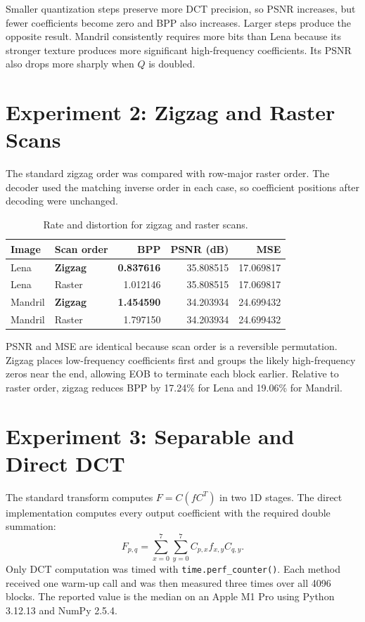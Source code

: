 \documentclass[10pt,a4paper]{article}
\begin{document}
Smaller quantization steps preserve more DCT precision, so PSNR increases, but fewer coefficients become zero and BPP also increases. Larger steps produce the opposite result. Mandril consistently requires more bits than Lena because its stronger texture produces more significant high-frequency coefficients. Its PSNR also drops more sharply when $Q$ is doubled.

\section{Experiment 2: Zigzag and Raster Scans}

The standard zigzag order was compared with row-major raster order. The decoder used the matching inverse order in each case, so coefficient positions after decoding were unchanged.

\begin{table}[ht]
\centering
\small
\begin{tabular}{llrrr}
\toprule
Image & Scan order & BPP & PSNR (dB) & MSE \\
\midrule
Lena    & \textbf{Zigzag} & \textbf{0.837616} & 35.808515 & 17.069817 \\
Lena    & Raster & 1.012146 & 35.808515 & 17.069817 \\
\midrule
Mandril & \textbf{Zigzag} & \textbf{1.454590} & 34.203934 & 24.699432 \\
Mandril & Raster & 1.797150 & 34.203934 & 24.699432 \\
\bottomrule
\end{tabular}
\caption{Rate and distortion for zigzag and raster scans.}
\end{table}

PSNR and MSE are identical because scan order is a reversible permutation. Zigzag places low-frequency coefficients first and groups the likely high-frequency zeros near the end, allowing EOB to terminate each block earlier. Relative to raster order, zigzag reduces BPP by 17.24\% for Lena and 19.06\% for Mandril.

\section{Experiment 3: Separable and Direct DCT}

The standard transform computes $F=C(fC^T)$ in two 1D stages. The direct implementation computes every output coefficient with the required double summation:
\[
    F_{p,q}=\sum_{x=0}^{7}\sum_{y=0}^{7}
    C_{p,x}f_{x,y}C_{q,y}.
\]
Only DCT computation was timed with \texttt{time.perf\_counter()}. Each method received one warm-up call and was then measured three times over all 4096 blocks. The reported value is the median on an Apple M1 Pro using Python 3.12.13 and NumPy 2.5.4.
\end{document}
